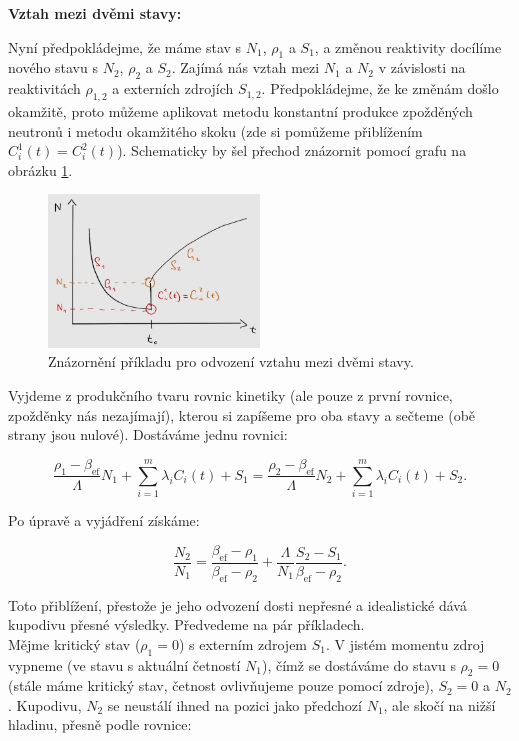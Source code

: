 \textbf{Vztah mezi dvěmi stavy:}

Nyní předpokládejme, že máme stav s $N_1$, $\rho_1$ a $S_1$, a změnou reaktivity docílíme nového stavu s $N_2$, $\rho_2$ a $S_2$. Zajímá nás vztah mezi $N_1$ a $N_2$ v závislosti na reaktivitách $\rho_{1,2}$ a externích zdrojích $S_{1,2}$. Předpokládejme, že ke změnám došlo okamžitě, proto můžeme aplikovat metodu konstantní produkce zpožděných neutronů i metodu okamžitého skoku (zde si pomůžeme přiblížením $C_i^1(t) = C_i^2(t)$). Schematicky by šel přechod znázornit pomocí grafu na obrázku \ref{fig_podil_N_ukazka}.

\begin{figure}[H]
  \centering
  \includegraphics[width=0.5\textwidth]{img/podil_N_ukazka.jpg}
  \caption{Znázornění příkladu pro odvození vztahu mezi dvěmi stavy.}
  \label{fig_podil_N_ukazka}
\end{figure}

Vyjdeme z produkčního tvaru rovnic kinetiky (ale pouze z první rovnice, zpožděnky nás nezajímají), kterou si zapíšeme pro oba stavy a sečteme (obě strany jsou nulové). Dostáváme jednu rovnici:

$$ \dfrac{\rho_1 - \beta_{\text{ef}}}{\Lambda} N_1 + \sum_{i=1}^m \lambda_i C_i(t) + S_1 = \dfrac{\rho_2 - \beta_{\text{ef}}}{\Lambda} N_2 + \sum_{i=1}^m \lambda_i C_i(t) + S_2. $$

Po úpravě a vyjádření získáme:

$$ \dfrac{N_2}{N_1} = \dfrac{\beta_{\text{ef}} - \rho_1}{\beta_{\text{ef}} - \rho_2} + \dfrac{\Lambda}{N_1} \dfrac{S_2 - S_1}{\beta_{\text{ef}} - \rho_2}. $$

Toto přiblížení, přestože je jeho odvození dosti nepřesné a idealistické dává kupodivu přesné výsledky. Předvedeme na pár příkladech.\\

Mějme kritický stav ($\rho_1 = 0$) s externím zdrojem $S_1$. V jistém momentu zdroj vypneme (ve stavu s aktuální četností $N_1$), čímž se dostáváme do stavu s $\rho_2 = 0$ (stále máme kritický stav, četnost ovlivňujeme pouze pomocí zdroje), $S_2 = 0$ a $N_2$. Kupodivu, $N_2$ se neustálí ihned na pozici jako předchozí $N_1$, ale skočí na nižší hladinu, přesně podle rovnice:

